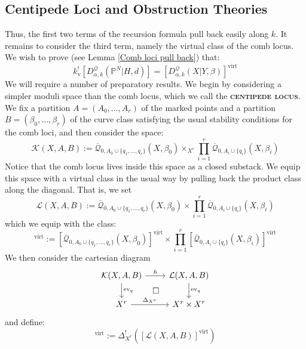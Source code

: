 \documentclass[11pt]{amsart}
\newcommand{\Q}[4]{\overline{\mathcal Q}_{#1,#2}(#3,#4)}
\newcommand{\PP}{\mathbb P}
\newcommand{\virt}[1]{[#1]^{\operatorname{virt}}}
\newcommand{\ev}{\operatorname{ev}}
\newcommand{\ildef}[1]{\textbf{\textsc{#1}}}
\theoremstyle{plain}
\theoremstyle{definition}
\begin{document}
\subsection{Centipede Loci and Obstruction Theories}
Thus, the first two terms of the recursion formula pull back easily along $k$. It remains to consider the third term, namely the virtual class of the comb locus. We wish to prove (see Lemma \ref{Comb loci pull back}) that:
\begin{equation*} k_{\text{v}}^! [D^\mathcal{Q}_{\alpha,k}(\PP^N|H,d)] = \virt{D^\mathcal{Q}_{\alpha,k}(X|Y,\beta)} \end{equation*}
We will require a number of preparatory results. We begin by considering a simpler moduli space than the comb locus, which we call the \ildef{centipede locus}. We fix a partition $A=(A_0,\ldots,A_r)$ of the marked points and a partition $B=(\beta_0, \ldots, \beta_r)$ of the curve class satisfying the usual stability conditions for the comb loci, and then consider the space:
\begin{equation*} \mathcal{K}(X,A,B) := \Q{0}{A_0 \cup \{ q_1, \ldots, q_r \}}{X}{\beta_0} \times_{X^r} \prod_{i=1}^r \Q{0}{A_i\cup\{q_i\}}{X}{\beta_i} \end{equation*}
Notice that the comb locus lives inside this space as a closed substack. We equip this space with a virtual class in the usual way by pulling back the product class along the diagonal. That is, we set
\begin{equation*} \mathcal{L}(X,A,B) :=  \Q{0}{A_0 \cup \{ q_1, \ldots, q_r \}}{X}{\beta_0} \times \prod_{i=1}^r \Q{0}{A_i\cup\{q_i\}}{X}{\beta_i} \end{equation*}
which we equip with the class:
\begin{equation*} \virt{\mathcal{L}(X,A,B)} := \virt{\Q{0}{A_0 \cup \{ q_1, \ldots, q_r \}}{X}{\beta_0}} \times \prod_{i=1}^r \virt{\Q{0}{A_i\cup\{q_i\}}{X}{\beta_i}} \end{equation*}
We then consider the cartesian diagram
\begin{equation} \label{Product diagram}
\begin{tikzcd}
\mathcal{K}(X,A,B) \ar[r,"h"] \ar[d,"\ev_q"] \ar[rd,phantom,"\square"] & \mathcal{L}(X,A,B) \ar[d,"\ev_q"] \\
X^r \ar[r,"\Delta_{X^r}"] & X^r \times X^r
\end{tikzcd}
\end{equation}
and define:
\begin{equation*} \virt{\mathcal{K}(X,A,B)} := \Delta_{X^r}^! (\virt{\mathcal{L}(X,A,B)}) \end{equation*}
\end{document}
